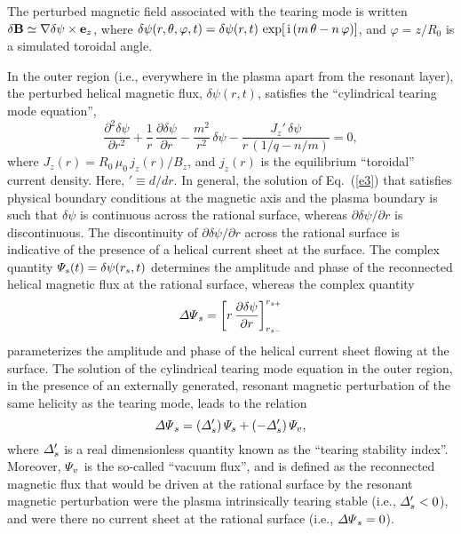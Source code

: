 \documentclass[12pt,prb,aps]{revtex4-1}
\begin{document}
The perturbed magnetic field associated with the tearing mode is written $\delta{\bf B} \simeq \nabla\delta\psi\times{\bf e}_z$,  
where
$\delta\psi(r,\theta,\varphi,t)= \delta\psi(r,t)\,\exp[\,{\rm i}\,(m\,\theta-n\,\varphi)]$, 
and $\varphi=z/R_0$ is a simulated toroidal angle. 

In the outer region  (i.e., everywhere in the plasma
apart from the resonant layer), the perturbed helical magnetic flux, $\delta\psi(r,t)$, satisfies the
``cylindrical tearing mode equation'',\,\cite{wes}
\begin{equation}\label{e3}
\frac{\partial^2\delta\psi}{\partial r^2} + \frac{1}{r}\,\frac{\partial\delta\psi}{\partial r}-\frac{m^2}{r^2}\,\delta\psi - \frac{J_z'\,\delta\psi}{r\,(1/q-n/m)}=  0,
\end{equation}
where 
$J_z(r)= R_0\,\mu_0\,j_z(r)/B_z$,
and $j_z(r)$ is the equilibrium ``toroidal'' current density. Here, $'\equiv d/dr$. In general, the solution of Eq.~(\ref{e3}) that satisfies physical
boundary conditions at the magnetic axis and the plasma boundary is such that $\delta\psi$ is continuous
across the rational surface, whereas $\partial\delta\psi/\partial r$ is discontinuous. The discontinuity of
 $\partial\delta\psi/\partial r$ across the rational surface is indicative of the presence of a helical current
 sheet at the surface.  The complex quantity ${\mit\Psi}_s(t)= \delta\psi(r_s,t)$ determines the amplitude
 and phase of the reconnected helical magnetic flux at the rational surface, whereas the complex quantity\,\cite{rf1993}
 \begin{equation}
{\mit\Delta\Psi}_s = \left[r\,\frac{\partial \delta\psi}{\partial r}\right]_{r_{s-}}^{r_{s+}}
\end{equation}
parameterizes the amplitude and phase of the helical current sheet flowing at the surface. The solution of
the cylindrical tearing mode equation in the outer region, in the presence of an externally generated, resonant magnetic perturbation 
of the same helicity as the tearing mode, leads to the relation\,\cite{rf1993,fkr}
\begin{equation}\label{e110}
{\mit\Delta\Psi}_s= ({\mit\Delta}_s')\,{\mit\Psi}_s + (-{\mit\Delta}_s')\,{\mit\Psi}_v,
\end{equation}
where ${\mit\Delta}_s'$ is a real dimensionless quantity known as the ``tearing stability index''. Moreover,
${\mit\Psi}_v$ is the so-called ``vacuum flux'', and is defined as the reconnected magnetic flux
that would be driven at the rational surface by the resonant magnetic perturbation were the
plasma intrinsically tearing stable (i.e., ${\mit\Delta}_s' <0$), and were there no current sheet at the rational surface
(i.e., ${\mit\Delta\Psi}_s=0$).
\end{document}
